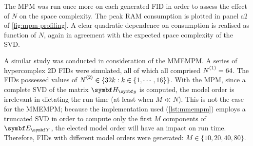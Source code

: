 The \ac{MPM} was run once more on each generated \ac{FID} in order to assess
the effect of $N$ on the space complexity.
The peak \ac{RAM} consumption is plotted in panel a2 of \cref{fig:mpm-profiling}.
A clear quadratic dependence on consumption is realised as function of $N$,
again in agreement with the expected space complexity of the
\ac{SVD}.

A similar study was conducted in consideration of the \ac{MMEMPM}. A
series of hypercomplex \ac{2D} \acp{FID} were simulated, all of which all
comprised $\None = 64$. The \acp{FID} possessed values of $\Ntwo \in \lbrace
32k : k \in \lbrace 1, \cdots, 16 \rbrace \rbrace$.
With the \ac{MPM}, since a complete \ac{SVD} of the matrix $\Hy$ is computed,
the model order is irrelevant in dictating the run time (at least when $M \ll
N$). This is not the case for the \ac{MMEMPM}; because the \Python
implementation used (\cref{lst:mmempm}) employs a truncated \ac{SVD} in order
to compute only the first $M$ components of $\EY$, the elected model order will
have an impact on run time.  Therefore, \acp{FID} with different model orders
were generated: $M \in \lbrace 10, 20, 40, 80 \rbrace$.

